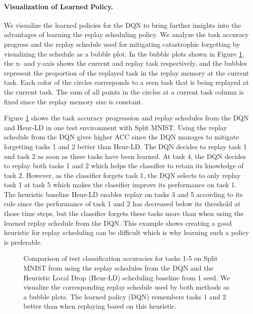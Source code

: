 \vspace{-3mm}
\paragraph{Visualization of Learned Policy.}
We visualize the learned policies for the DQN to bring further insights into the advantages of learning the replay scheduling policy. We analyze the task accuracy progress and the replay schedule used for mitigating catastrophic forgetting by visualizing the schedule as a bubble plot. In the bubble plots shown in Figure \ref{fig:mnist_policy_illustration_dqn_vs_heuristic2}, the x- and y-axis shows the current and replay task respectively, and the bubbles represent the proportion of the replayed task in the replay memory at the current task. Each color of the circles corresponds to a seen task that is being replayed at the current task. The sum of all points in the circles at a current task column is fixed since the replay memory size is constant. 

Figure \ref{fig:mnist_policy_illustration_dqn_vs_heuristic2} shows the task accuracy progression and replay schedules from the DQN and Heur-LD in one test environment with Split MNIST. Using the replay schedule from the DQN gives higher ACC since the DQN manages to mitigate forgetting tasks 1 and 2 better than Heur-LD. The DQN decides to replay task 1 and task 2 as soon as these tasks have been learned. At task 4, the DQN decides to replay both tasks 1 and 2 which helps the classifier to retain its knowledge of task 2. However, as the classifier forgets task 1, the DQN selects to only replay task 1 at task 5 which makes the classifier improve its performance on task 1. 
The heuristic baseline Heur-LD enables replay on tasks 3 and 5 according to its rule since the performance of task 1 and 2 has decreased below its threshold at those time steps, but the classifier forgets these tasks more than when using the learned replay schedule from the DQN. This example shows creating a good heuristic for replay scheduling can be difficult which is why learning such a policy is preferable. 

\begin{figure}[t]
	\centering
	\setlength{\figwidth}{0.26\textwidth}
	\setlength{\figheight}{.15\textheight}
	
	\vspace{-3mm}
	\caption{ Comparison of test classification accuracies for tasks 1-5 on Split MNIST from using the replay schedules from the DQN and the Heuristic Local Drop (Heur-LD) scheduling baseline from 1 seed. We visualize the corresponding replay schedule used by both methods as a bubble plots. The learned policy (DQN) remembers tasks 1 and 2 better than when replaying based on this heuristic. 
	}
	\vspace{-3mm}
	\label{fig:mnist_policy_illustration_dqn_vs_heuristic2}
\end{figure}



